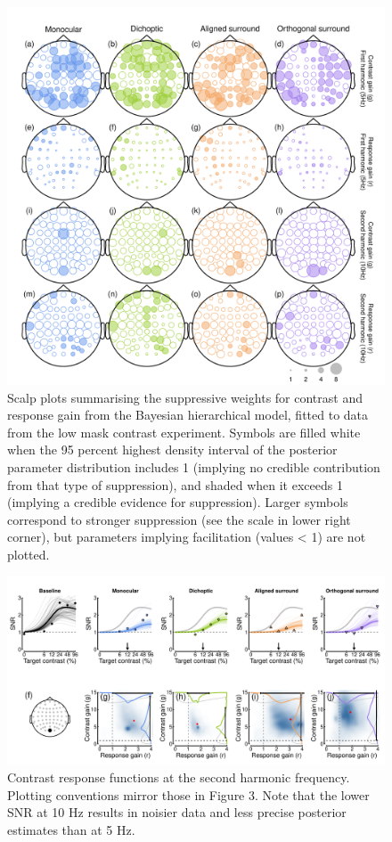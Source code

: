 \documentclass[]{article}
\begin{document}
\begin{figure}

{\centering \includegraphics{figures/modelheads1} 

}

\caption{Scalp plots summarising the suppressive weights for contrast and response gain from the Bayesian hierarchical model, fitted to data from the low mask contrast experiment. Symbols are filled white when the 95 percent highest density interval of the posterior parameter distribution includes 1 (implying no credible contribution from that type of suppression), and shaded when it exceeds 1 (implying a credible evidence for suppression). Larger symbols correspond to stronger suppression (see the scale in lower right corner), but parameters implying facilitation (values < 1) are not plotted.}\label{fig:modelheads1}
\end{figure}

\begin{figure}

{\centering \includegraphics{figures/modelfig2} 

}

\caption{Contrast response functions at the second harmonic frequency. Plotting conventions mirror those in Figure 3. Note that the lower SNR at 10 Hz results in noisier data and less precise posterior estimates than at 5 Hz.}\label{fig:modelfig2}
\end{figure}
\end{document}
